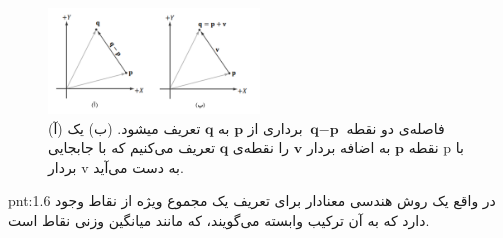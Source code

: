 {\begin{spacing}{1.5}
        \begin{figure}[H]
            \centering
            \setlength{\belowcaptionskip}{-10pt}
            \includegraphics[width=0.5\textwidth]{Images/4/1/4.Session.1.1.17}
            \caption {(آ) فاصله‌ی دو نقطه $\textbf{q}-\textbf{p}$ برداری از $\textbf{p}$ به $\textbf{q}$ تعریف میشود. (ب) یک نقطه $\textbf{p}$ به اضافه بردار $\textbf{v}$ را نقطه‌ی $\textbf{q}$ تعریف می‌کنیم که با جابجایی p با بردار v به دست می‌آید.}
            \label{fig:4.Session.1.1.17}
        \end{figure}

        \begin{point}{pnt:1.6}
            \Large
            در واقع یک روش هندسی معنادار برای تعریف یک مجموع ویژه از نقاط وجود دارد که به آن ترکیب وابسته می‌گویند، که مانند میانگین وزنی نقاط است.
        \end{point}
    \end{spacing}
}


